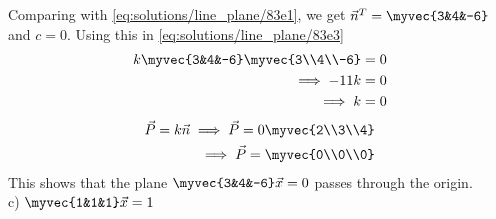 Comparing with \eqref{eq:solutions/line_plane/83e1}, we get $\vec{n}^T = \myvec{3&4&-6}$ and  $c=0$. Using this in \eqref{eq:solutions/line_plane/83e3}
\begin{align}
	k\myvec{3&4&-6}\myvec{3\\4\\-6} = 0\\
	\implies -11k = 0\\
	\implies k = 0
\end{align}
\begin{align}
	\vec{P} = k\vec{n}
	\implies\vec{P} = 0\myvec{2\\3\\4}\\
	\implies\vec{P}= \myvec{0\\0\\0}
\end{align}
This shows that the plane $\myvec{3&4&-6}\vec{x} = 0$ passes through the origin.\\

c) $\myvec{1&1&1}\vec{x} = 1$\\

